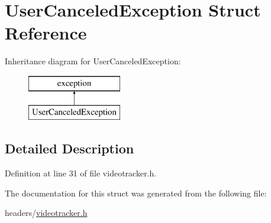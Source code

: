 \hypertarget{structUserCanceledException}{}\section{User\+Canceled\+Exception Struct Reference}
\label{structUserCanceledException}
Inheritance diagram for User\+Canceled\+Exception\+:\begin{figure}[H]
\begin{center}
\leavevmode
\includegraphics[height=2.000000cm]{structUserCanceledException}
\end{center}
\end{figure}


\subsection{Detailed Description}


Definition at line 31 of file videotracker.\+h.



The documentation for this struct was generated from the following file\+:\begin{DoxyCompactItemize}
\item 
headers/\hyperlink{videotracker_8h}{videotracker.\+h}\end{DoxyCompactItemize}
